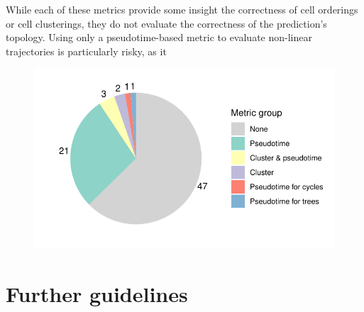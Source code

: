 While each of these metrics provide some insight the correctness of cell orderings or cell clusterings, they do not evaluate the correctness of the prediction's topology. Using only a pseudotime-based metric to evaluate non-linear trajectories is particularly risky, as it 

\begin{figure}[htb!]
	\centering
	\includegraphics[width=.5\linewidth]{fig/metrics.pdf} 
	\caption{}
	\label{fig:metrics}
\end{figure}

\section{Further guidelines}

